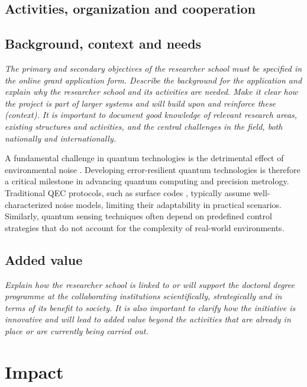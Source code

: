 \documentclass{scrreprt}
\begin{document}
\subsection{Activities, organization and cooperation}


\subsection{Background, context and needs}

{\em The primary and secondary objectives of the researcher school must be
specified in the online grant application form.  Describe the
background for the application and explain why the researcher school
and its activities are needed. Make it clear how the project is part
of larger systems and will build upon and reinforce these
(context). It is important to document good knowledge of relevant
research areas, existing structures and activities, and the central
challenges in the field, both nationally and internationally.}





A fundamental challenge in quantum technologies is the detrimental
effect of environmental noise \cite{gardiner_quantum_2004}. Developing
error-resilient quantum technologies is therefore a critical milestone
in advancing quantum computing and precision metrology. Traditional
QEC protocols, such as surface codes \cite{fowler_surface_2012},
typically assume well-characterized noise models, limiting their
adaptability in practical scenarios. Similarly, quantum sensing
techniques often depend on predefined control strategies that do not
account for the complexity of real-world environments.

\subsection{Added value}

{\em Explain how the researcher school is linked to or will support the
doctoral degree programme at the collaborating institutions
scientifically, strategically and in terms of its benefit to
society. It is also important to clarify how the initiative is
innovative and will lead to added value beyond the activities that are
already in place or are currently being carried out.}

\section{Impact}
\end{document}

